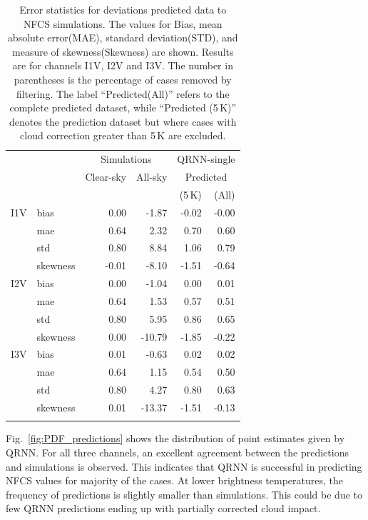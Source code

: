 \documentclass[amt]{copernicus}
\begin{document}
\begin{table}[t]
	\caption{ Error statistics for deviations predicted data to NFCS simulations. 
		The values for Bias, mean absolute error(MAE), standard deviation(STD), and measure of skewness(Skewness) are shown. Results are for channels I1V, I2V and I3V. The number in parentheses is the percentage of cases removed by filtering. The label ``Predicted(All)'' refers to the complete predicted dataset, while ``Predicted (5\,K)'' denotes the prediction dataset but where cases with cloud correction greater than 5\,K are excluded.}
	\label{tab:error_statistics_ici}
	\begin{tabular}{llrr|rr}
		\tophline
		&&\multicolumn{2}{c|}{Simulations}& \multicolumn{2}{c}{QRNN-single} \\
		\cline{3-6}
		&&   Clear-sky &   All-sky &  \multicolumn{2}{c}{Predicted}  \\
		&&			   &			&	(5\,K) & (All) \\
		\middlehline
		
		I1V&  bias     &  0.00 & -1.87 & -0.02 & -0.00  \\
		&mae      &  0.64 &  2.32 &  0.70 &  0.60   \\
		&std      &  0.80 &  8.84 &  1.06 &  0.79   \\
		&skewness & -0.01 & -8.10 & -1.51 & -0.64  \\
		\middlehline
		I2V & bias     & 0.00 &  -1.04 &  0.00 &  0.01  \\
		&mae      & 0.64 &   1.53 &  0.57 &  0.51 \\
		&std      & 0.80 &   5.95 &  0.86 &  0.65 \\
		&skewness & 0.00 & -10.79 & -1.85 & -0.22  \\
		\middlehline	
		I3V & bias     & 0.01 &  -0.63 &  0.02 &  0.02  \\
		&mae      & 0.64 &   1.15 &  0.54 &  0.50  \\
		&std      & 0.80 &   4.27 &  0.80 &  0.63  \\
		&skewness & 0.01 & -13.37 & -1.51 & -0.13  \\
		\bottomhline
	\end{tabular}
	\belowtable{} %
\end{table}

Fig.~\ref{fig:PDF_predictions} shows the distribution of point estimates given by QRNN. For all three channels, an excellent agreement between the predictions and simulations is observed. This indicates that QRNN is successful in predicting NFCS values for majority of the cases. At lower brightness temperatures, the frequency of predictions is slightly smaller than simulations. This could be due to few QRNN predictions ending up with partially corrected cloud impact. 
\end{document}
